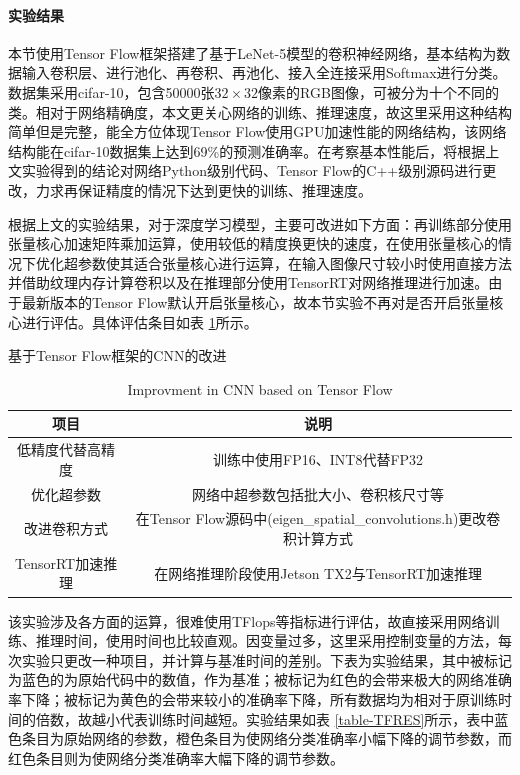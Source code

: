 \paragraph{实验结果}
\par 本节使用Tensor Flow框架搭建了基于LeNet-5模型的卷积神经网络，基本结构为数据输入卷积层、进行池化、再卷积、再池化、接入全连接采用Softmax进行分类。数据集采用cifar-10，包含50000张$ 32 \times 32 $像素的RGB图像，可被分为十个不同的类。相对于网络精确度，本文更关心网络的训练、推理速度，故这里采用这种结构简单但是完整，能全方位体现Tensor Flow使用GPU加速性能的网络结构，该网络结构能在cifar-10数据集上达到69\%的预测准确率。在考察基本性能后，将根据上文实验得到的结论对网络Python级别代码、Tensor Flow的C++级别源码进行更改，力求再保证精度的情况下达到更快的训练、推理速度。
\par 根据上文的实验结果，对于深度学习模型，主要可改进如下方面：再训练部分使用张量核心加速矩阵乘加运算，使用较低的精度换更快的速度，在使用张量核心的情况下优化超参数使其适合张量核心进行运算，在输入图像尺寸较小时使用直接方法并借助纹理内存计算卷积以及在推理部分使用TensorRT对网络推理进行加速。由于最新版本的Tensor Flow默认开启张量核心，故本节实验不再对是否开启张量核心进行评估。具体评估条目如表 \ref{table-TFList}所示。
\begin{table}
	\centering
	\renewcommand{\thetable}{\arabic{section}-\arabic{table} }
	\renewcommand{\tablename}{表}
	\caption{基于Tensor Flow框架的CNN的改进}
	\addtocounter{table}{-1}
	\renewcommand{\thetable}{\arabic{section}-\arabic{table} }
	\renewcommand{\tablename}{Table}
	\caption{Improvment in CNN based on Tensor Flow}
	\begin{tabular}{cc}
		\toprule
		项目 & 说明\\
		\midrule
		低精度代替高精度 & 训练中使用FP16、INT8代替FP32\\
		优化超参数 & 网络中超参数包括批大小、卷积核尺寸等\\
		改进卷积方式 & 在Tensor Flow源码中(eigen\_spatial\_convolutions.h)更改卷积计算方式\\
		TensorRT加速推理 & 在网络推理阶段使用Jetson TX2与TensorRT加速推理\\
		\bottomrule
	\end{tabular} \label{table-TFList} 
\end{table}
\par 该实验涉及各方面的运算，很难使用TFlops等指标进行评估，故直接采用网络训练、推理时间，使用时间也比较直观。因变量过多，这里采用控制变量的方法，每次实验只更改一种项目，并计算与基准时间的差别。下表为实验结果，其中被标记为蓝色的为原始代码中的数值，作为基准；被标记为红色的会带来极大的网络准确率下降；被标记为黄色的会带来较小的准确率下降，所有数据均为相对于原训练时间的倍数，故越小代表训练时间越短。实验结果如表 \ref{table-TFRES}所示，表中蓝色条目为原始网络的参数，橙色条目为使网络分类准确率小幅下降的调节参数，而红色条目则为使网络分类准确率大幅下降的调节参数。
